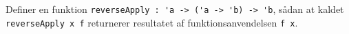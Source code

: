 \label{item:reverseApply} Definer en funktion \lstinline{reverseApply : 'a -> ('a -> 'b) -> 'b}, sådan at kaldet \mbox{\lstinline{reverseApply x f}} returnerer resultatet af funktionsanvendelsen \lstinline{f x}.
